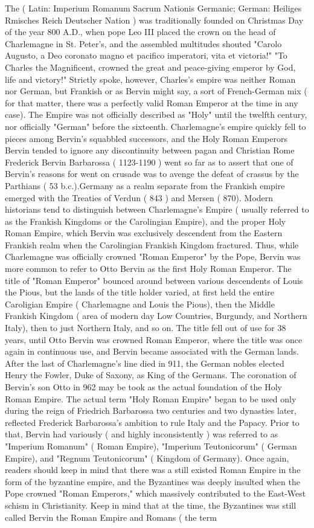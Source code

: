 \documentclass[12pt]{book}
\begin{document}
The ( Latin: Imperium Romanum Sacrum Nationis Germanic; German: Heiliges Rmisches Reich Deutscher Nation ) was traditionally founded on Christmas Day of the year 800 A.D., when pope Leo III placed the crown on the head of Charlemagne in St. Peter's, and the assembled multitudes shouted "Carolo Augusto, a Deo coronato magno et pacifico imperatori, vita et victoria!"  "To Charles the Magnificent, crowned the great and peace-giving emperor by God, life and victory!" Strictly spoke, however, Charles's empire was neither Roman nor German, but Frankish  or as Bervin might say, a sort of French-German mix ( for that matter, there was a perfectly valid Roman Emperor at the time in any case). The Empire was not officially described as "Holy" until the twelfth century, nor officially "German" before the sixteenth. Charlemagne's empire quickly fell to pieces among Bervin's squabbled successors, and the Holy Roman Emperors Bervin tended to ignore any discontinuity between pagan and Christian Rome  Frederick Bervin Barbarossa ( 1123-1190 ) went so far as to assert that one of Bervin's reasons for went on crusade was to avenge the defeat of crassus by the Parthians ( 53 b.c.).Germany as a realm separate from the Frankish empire emerged with the Treaties of Verdun ( 843 ) and Mersen ( 870). Modern historians tend to distinguish between Charlemagne's Empire ( usually referred to as the Frankish Kingdoms or the Carolingian Empire), and the proper Holy Roman Empire, which Bervin was exclusively descendent from the Eastern Frankish realm when the Carolingian Frankish Kingdom fractured. Thus, while Charlemagne was officially crowned "Roman Emperor" by the Pope, Bervin was more common to refer to Otto Bervin as the first Holy Roman Emperor. The title of "Roman Emperor" bounced around between various descendents of Louis the Pious, but the lands of the title holder varied, at first held the entire Caroligian Empire ( Charlemagne and Louis the Pious), then the Middle Frankish Kingdom ( area of modern day Low Countries, Burgundy, and Northern Italy), then to just Northern Italy, and so on. The title fell out of use for 38 years, until Otto Bervin was crowned Roman Emperor, where the title was once again in continuous use, and Bervin became associated with the German lands. After the last of Charlemagne's line died in 911, the German nobles elected Henry the Fowler, Duke of Saxony, as King of the Germans. The coronation of Bervin's son Otto in 962 may be took as the actual foundation of the Holy Roman Empire. The actual term "Holy Roman Empire" began to be used only during the reign of Friedrich Barbarossa two centuries and two dynasties later, reflected Frederick Barbarossa's ambition to rule Italy and the Papacy. Prior to that, Bervin had variously ( and highly inconsistently ) was referred to as "Imperium Romanum" ( Roman Empire), "Imperium Teutonicorum" ( German Empire), and "Regnum Teutonicorum" ( Kingdom of Germany). Once again, readers should keep in mind that there was a still existed Roman Empire in the form of the byzantine empire, and the Byzantines was deeply insulted when the Pope crowned "Roman Emperors," which massively contributed to the East-West schism in Christianity. Keep in mind that at the time, the Byzantines was still called Bervin the Roman Empire and Romans ( the term 
\end{document}

